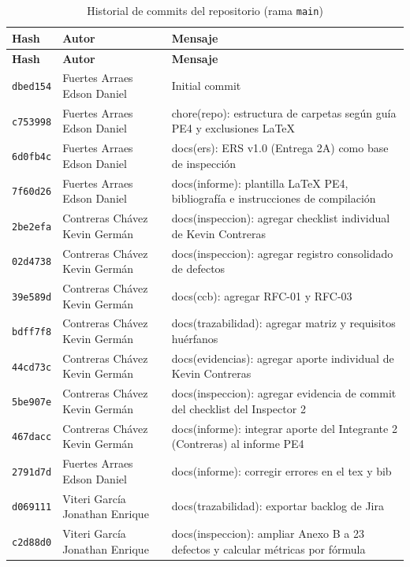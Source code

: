 \documentclass[journal,onecolumn]{IEEEtran}
\begin{document}
	\begin{longtable}{L{1.6cm} L{2.6cm} L{9.3cm}}
		\caption{Historial de commits del repositorio (rama \texttt{main})}
		\label{tab:commits-git}\\
		\toprule
		\textbf{Hash} & \textbf{Autor} & \textbf{Mensaje} \\
		\midrule
		\endfirsthead
		\toprule
		\textbf{Hash} & \textbf{Autor} & \textbf{Mensaje} \\
		\midrule
		\endhead
		\bottomrule
		\endfoot
		\texttt{dbed154} & Fuertes Arraes Edson Daniel & Initial commit \\
		\texttt{c753998} & Fuertes Arraes Edson Daniel & chore(repo): estructura de carpetas según guía PE4 y exclusiones LaTeX \\
		\texttt{6d0fb4c} & Fuertes Arraes Edson Daniel & docs(ers): ERS v1.0 (Entrega 2A) como base de inspección \\
		\texttt{7f60d26} & Fuertes Arraes Edson Daniel & docs(informe): plantilla LaTeX PE4, bibliografía e instrucciones de compilación \\
		\texttt{2be2efa} & Contreras Chávez Kevin Germán & docs(inspeccion): agregar checklist individual de Kevin Contreras \\
		\texttt{02d4738} & Contreras Chávez Kevin Germán & docs(inspeccion): agregar registro consolidado de defectos \\
		\texttt{39e589d} & Contreras Chávez Kevin Germán & docs(ccb): agregar RFC-01 y RFC-03 \\
		\texttt{bdff7f8} & Contreras Chávez Kevin Germán & docs(trazabilidad): agregar matriz y requisitos huérfanos \\
		\texttt{44cd73c} & Contreras Chávez Kevin Germán & docs(evidencias): agregar aporte individual de Kevin Contreras \\
		\texttt{5be907e} & Contreras Chávez Kevin Germán & docs(inspeccion): agregar evidencia de commit del checklist del Inspector 2 \\
		\texttt{467dacc} & Contreras Chávez Kevin Germán & docs(informe): integrar aporte del Integrante 2 (Contreras) al informe PE4 \\
		\texttt{2791d7d} & Fuertes Arraes Edson Daniel & docs(informe): corregir errores en el tex y bib \\
		\texttt{d069111} & Viteri García Jonathan Enrique & docs(trazabilidad): exportar backlog de Jira \\
		\texttt{c2d88d0} & Viteri García Jonathan Enrique & docs(inspeccion): ampliar Anexo B a 23 defectos y calcular métricas por fórmula \\

\end{longtable}
\end{document}
